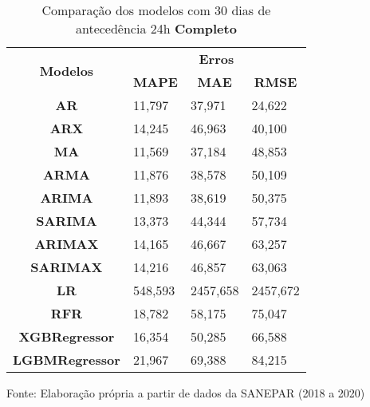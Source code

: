 \begin{table}[H]
	\centering
	\caption{Comparação dos modelos com 30 dias de antecedência 24h \textbf{Completo} }\label{tb:60-24cm}
	\begin{tabular}{@{}clll@{}}
		\toprule
		\multirow{2}{*}{\textbf{Modelos}} & \multicolumn{3}{c}{\textbf{Erros}}                                                                       \\ \cmidrule(l){2-4} 
		& \multicolumn{1}{c}{\textbf{MAPE}} & \multicolumn{1}{c}{\textbf{MAE}} & \multicolumn{1}{c}{\textbf{RMSE}} \\ \hline
\textbf{AR}                       & 11,797                            & 37,971                           & 24,622                            \\
\textbf{ARX}                      & 14,245                            & 46,963                           & 40,100                            \\
\textbf{MA}                       & 11,569                            & 37,184                           & 48,853                            \\
\textbf{ARMA}                     & 11,876                            & 38,578                           & 50,109                            \\
\textbf{ARIMA}                    & 11,893                            & 38,619                           & 50,375                            \\
\textbf{SARIMA}                   & 13,373                            & 44,344                           & 57,734                            \\
\textbf{ARIMAX}                   & 14,165                            & 46,667                           & 63,257                            \\
\textbf{SARIMAX}                  & 14,216                            & 46,857                           & 63,063                            \\
\textbf{LR}        & 548,593                           & 2457,658                         & 2457,672                          \\
\textbf{RFR}  & 18,782                            & 58,175                           & 75,047                            \\
\textbf{XGBRegressor}             & 16,354                            & 50,285                           & 66,588                            \\
\textbf{LGBMRegressor}            & 21,967                            & 69,388                           & 84,215                            \\ \bottomrule
	\end{tabular}

Fonte: Elaboração própria a partir de dados da SANEPAR (2018 a 2020)
\end{table}